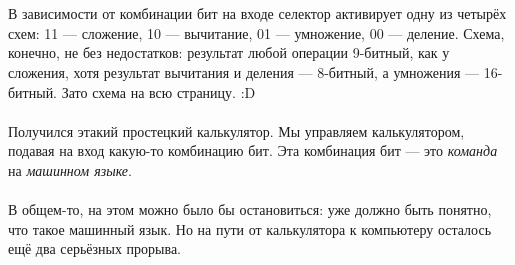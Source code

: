 \documentclass[11pt]{book}
\begin{document}
\\ \\
В зависимости от комбинации бит на входе селектор активирует одну из четырёх схем: 11 --- сложение, 10 --- вычитание, 01 --- умножение, 00 --- деление.
Схема, конечно, не без недостатков: результат любой операции 9-битный, как у сложения, хотя результат вычитания и деления --- 8-битный, а умножения --- 16-битный.
Зато схема на всю страницу. :D
\\ \\
Получился этакий простецкий калькулятор.
Мы управляем калькулятором, подавая на вход какую-то комбинацию бит.
Эта комбинация бит --- это \emph{команда} на \emph{машинном языке}.
\\ \\
В общем-то, на этом можно было бы остановиться: уже должно быть понятно, что такое машинный язык.
Но на пути от калькулятора к компьютеру осталось ещё два серьёзных прорыва.
\end{document}
